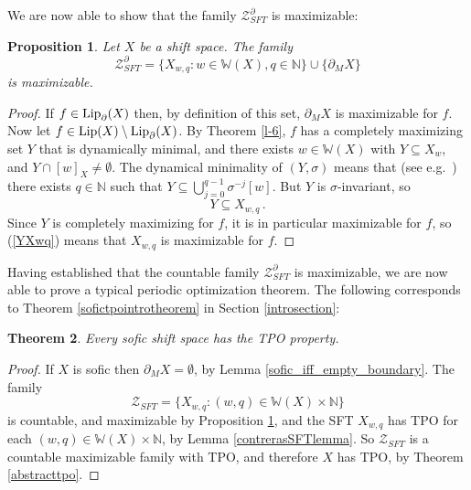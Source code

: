 \documentclass[reqno,11pt]{amsart}
\newtheorem{thm}{Theorem}[section]
\newtheorem{prop}[thm]{Proposition}
\theoremstyle{definition}
\theoremstyle{remark}
\theoremstyle{remark}
\def \N {\mathbb N}
\def\lip{{\rm Lip}}
\def\w{\mathbb{W}}
\def\ZZ{\mathcal{Z}}
\numberwithin{equation}{section}
\begin{document}
We are now able to show that the family $\ZZ_{SFT}^\partial$ is maximizable:

\begin{prop}\label{sftmaximizablefamilylip}
Let $X$ be a shift space.
The family $$\ZZ_{SFT}^\partial=\{X_{w,q}:w\in\w(X), q\in\N\} \cup \{\partial_MX\}$$ is maximizable.
\end{prop}
\begin{proof}
If $f\in \lip_\partial(X)$ then, by definition of this set, $\partial_MX$ is maximizable for $f$.
Now let $f\in \lip(X)\setminus \lip_\partial(X)$.
By Theorem \ref{l-6}, 
$f$ has a completely maximizing set $Y$ that is dynamically minimal,
and there exists $w\in\w(X)$ 
with
$Y\subseteq X_w$,
and $Y\cap[w]_X\neq\emptyset$. 
 The dynamical minimality of $(Y,\sigma)$ means that
(see e.g.~\cite[Lem.~1.14]{furstenberg})
there exists $q\in\N$ such that 
$Y\subseteq \bigcup_{j=0}^{q-1} \sigma^{-j}[w] $.
But $Y$ is $\sigma$-invariant, so 
\begin{equation}\label{YXwq}
Y\subseteq X_{w,q}\,.
\end{equation}
Since $Y$ is completely maximizing for $f$, it is in particular maximizable for $f$, so (\ref{YXwq}) means that
$X_{w,q}$ is maximizable for $f$.  
\end{proof}



Having established that
the countable family
$\ZZ_{SFT}^\partial$
is maximizable, we are now able to prove a 
typical periodic optimization
theorem.
The following corresponds to Theorem \ref{sofictpointrotheorem} in Section \ref{introsection}:




\begin{thm}\label{sofictpotheorem}
Every sofic shift space has the TPO property.
\end{thm}
\begin{proof}
If $X$ is sofic then $\partial_M X=\emptyset$, by Lemma \ref{sofic_iff_empty_boundary}.
The family
$$\ZZ_{SFT}=\{X_{w,q}:(w,q)\in \w(X)\times\N\}$$
is countable, and maximizable by Proposition \ref{sftmaximizablefamilylip},
and the SFT $X_{w,q}$ has TPO
for each $(w,q)\in \w(X)\times\N$, by Lemma \ref{contrerasSFTlemma}.
So $\ZZ_{SFT}$ is a countable maximizable family with TPO, and therefore $X$ has TPO, by
Theorem \ref{abstracttpo}.
\end{proof}
\end{document}
